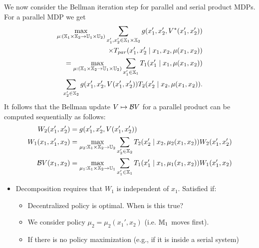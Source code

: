 \documentclass[conference]{IEEEtran}
\newcommand{\red}[1]{{\color{red} #1 }}
\begin{document}
We now consider the Bellman iteration step for parallel and serial product MDPs. For a parallel MDP we get
\begin{equation*}
\begin{aligned}
  \max_{\mu: (\mathbb{X}_1 \times \mathbb{X}_2 \rightarrow \mathbb{U}_1 \times \mathbb{U}_2)} \sum_{x_1', x_2' \in \mathbb{X}_1 \times \mathbb{X}_2}  g(x_1', x_2', V^*(x_1', x_2')) \\
  \times T_{par}(x_1', x_2' \mid x_1, x_2, \mu(x_1, x_2)) \\
  = \max_{\mu: (\mathbb{X}_1 \times \mathbb{X}_2 \rightarrow \mathbb{U}_1 \times \mathbb{U}_2)} \sum_{x_1' \in \mathbb{X}_1} T_1(x_1' \mid x_1, \mu(x_1, x_2)) \\
    \sum_{x_2' \in \mathbb{X}_2}  g(x_1', x_2', V(x_1', x_2')) T_2(x_2' \mid x_2, \mu(x_1, x_2)).
\end{aligned}
\end{equation*}
It follows that the Bellman update $V \mapsto \mathcal{B} V$ for a parallel product can be computed sequentially as follows:
\begin{equation}
\begin{aligned}
  W_2(x_1', x_2') &= g(x_1', x_2', V(x_1', x_2')) \\
  W_1(x_1, x_1', x_2) &= \max_{\mu_2: \mathbb{X}_1 \times \mathbb{X}_2 \rightarrow \mathbb{U}_2} \sum_{x_2' \in \mathbb{X}_2}  T_2(x_2' \mid x_2, \mu_2(x_1, x_2)) W_2(x_1', x_2')  \\
  \mathcal{B} V(x_1, x_2) &= \max_{\mu_1: \mathbb{X}_1 \times \mathbb{X}_2 \rightarrow \mathbb{U}_1}  \sum_{x_1' \in \mathbb{X}_1}  T_1(x_1' \mid x_1, \mu_1(x_1, x_2)) W_1(x_1', x_2)
\end{aligned}
\end{equation}

\red{
\begin{itemize}
  \item Decomposition requires that $W_1$ is independent of $x_1$. Satisfied if:
  \begin{itemize}
    \item Decentralized policy is optimal. When is this true?
    \item We consider policy $\mu_2 = \mu_2(x_1', x_2)$ (i.e. $\mathbb{M}_1$ moves first).
    \item If there is no policy maximization (e.g., if it is inside a serial system)
  \end{itemize}
\end{itemize}

}
\end{document}
